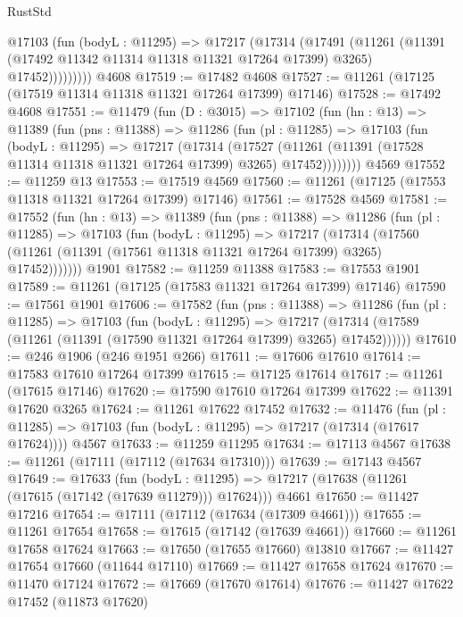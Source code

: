 \begin{lexlean}{RustStd}
\begin{coremodule}
            @17103
              (fun (bodyL : @11295) =>
              @17217
                (@17314
                  (@17491
                    (@11261
                      (@11391 (@17492 @11342 @11314 @11318 @11321 @17264 @17399) @3265)
                      @17452)))))))))
    @4608
@17519 := @17482 @4608
@17527 := @11261 (@17125 (@17519 @11314 @11318 @11321 @17264 @17399) @17146)
@17528 := @17492 @4608
@17551 := @11479
    (fun (D : @3015) =>
    @17102
      (fun (hn : @13) =>
      @11389
        (fun (pns : @11388) =>
        @11286
          (fun (pl : @11285) =>
          @17103
            (fun (bodyL : @11295) =>
            @17217
              (@17314
                (@17527
                  (@11261 (@11391 (@17528 @11314 @11318 @11321 @17264 @17399) @3265) @17452))))))))
    @4569
@17552 := @11259 @13
@17553 := @17519 @4569
@17560 := @11261 (@17125 (@17553 @11318 @11321 @17264 @17399) @17146)
@17561 := @17528 @4569
@17581 := @17552
    (fun (hn : @13) =>
    @11389
      (fun (pns : @11388) =>
      @11286
        (fun (pl : @11285) =>
        @17103
          (fun (bodyL : @11295) =>
          @17217
            (@17314
              (@17560 (@11261 (@11391 (@17561 @11318 @11321 @17264 @17399) @3265) @17452)))))))
    @1901
@17582 := @11259 @11388
@17583 := @17553 @1901
@17589 := @11261 (@17125 (@17583 @11321 @17264 @17399) @17146)
@17590 := @17561 @1901
@17606 := @17582
    (fun (pns : @11388) =>
    @11286
      (fun (pl : @11285) =>
      @17103
        (fun (bodyL : @11295) =>
        @17217 (@17314 (@17589 (@11261 (@11391 (@17590 @11321 @17264 @17399) @3265) @17452))))))
@17610 := @246 @1906 (@246 @1951 @266)
@17611 := @17606 @17610
@17614 := @17583 @17610 @17264 @17399
@17615 := @17125 @17614
@17617 := @11261 (@17615 @17146)
@17620 := @17590 @17610 @17264 @17399
@17622 := @11391 @17620 @3265
@17624 := @11261 @17622 @17452
@17632 := @11476
    (fun (pl : @11285) => @17103 (fun (bodyL : @11295) => @17217 (@17314 (@17617 @17624))))
    @4567
@17633 := @11259 @11295
@17634 := @17113 @4567
@17638 := @11261 (@17111 (@17112 (@17634 @17310)))
@17639 := @17143 @4567
@17649 := @17633
    (fun (bodyL : @11295) => @17217 (@17638 (@11261 (@17615 (@17142 (@17639 @11279))) @17624)))
    @4661
@17650 := @11427 @17216
@17654 := @17111 (@17112 (@17634 (@17309 @4661)))
@17655 := @11261 @17654
@17658 := @17615 (@17142 (@17639 @4661))
@17660 := @11261 @17658 @17624
@17663 := @17650 (@17655 @17660) @13810
@17667 := @11427 @17654 @17660 (@11644 @17110)
@17669 := @11427 @17658 @17624
@17670 := @11470 @17124
@17672 := @17669 (@17670 @17614)
@17676 := @11427 @17622 @17452 (@11873 @17620)

\end{coremodule}
\end{lexlean}
